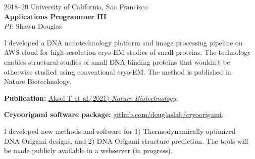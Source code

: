 \documentclass[12pt,letterpaper]{report}
\newcommand{\listitemspace}{0.25em}
\renewenvironment{itemize}
{\begin{list}{}{\setlength{\leftmargin}{0em}
                \setlength{\parskip}{0em}
                \setlength{\itemsep}{\listitemspace}
                \setlength{\parsep}{\listitemspace}}}
{\end{list}}
\begin{document}
\begin{tablist}
        \item[2018--20] \tab{}University of California, San Francisco \\
                             \textbf{Applications Programmer III} \\
                             \textit{PI}: Shawn Douglas \\
                             \begin{itemize}
                                \item \textbullet \hspace{0.2cm} I developed a DNA nanotechnology platform and image processing pipeline on AWS cloud for high-resolution cryo-EM studies of small proteins. The technology enables structural studies of small DNA binding proteins that wouldn't be otherwise studied using conventional cryo-EM. The method is published in Nature Biotechnology. 
                                \begin{itemize}
                                    \item \hspace{1cm} \textbf{Publication:} \href{https://doi.org/10.1038/s41587-020-0716-8}{Aksel T et al.(2021) \textit{Nature Biotechnology}}. 
                                    \item \hspace{1cm} \textbf{Cryoorigami software package:} \href{https://github.com/douglaslab/cryoorigami} {github.com/douglaslab/cryoorigami}. 
                                \end{itemize}
                                \item \textbullet \hspace{0.2cm} I developed new methods and software for 1) Thermodynamically optimized DNA Origami designs, and 2) DNA Origami structure prediction. The tools will be made publicly available in a webserver (in progress).
                             \end{itemize} 


\end{tablist}
\end{document}
